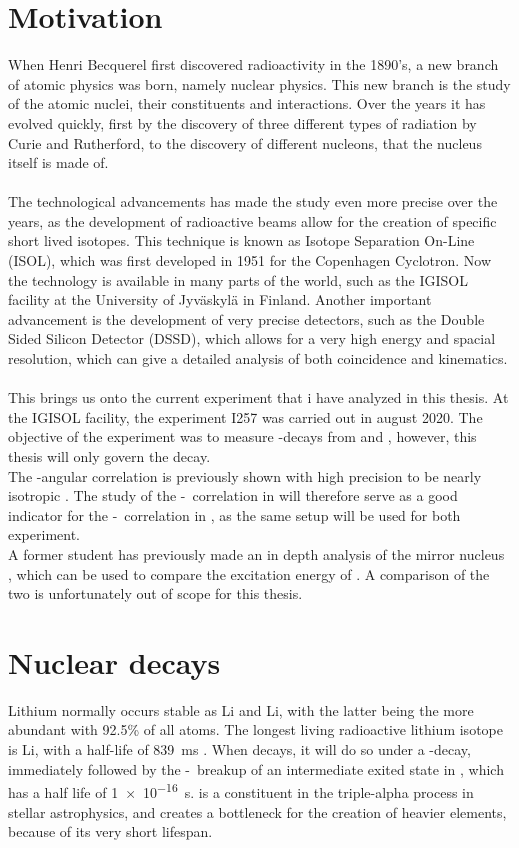 \section{Motivation}
When Henri Becquerel first discovered radioactivity in the 1890's, a new branch of atomic physics was born, namely nuclear physics. 
This new branch is the study of the atomic nuclei, their constituents and interactions. 
Over the years it has evolved quickly, first by the discovery of three different types of radiation by Curie and Rutherford, to the discovery of different nucleons, that the nucleus itself is made of. \\
\\
The technological advancements has made the study even more precise over the years, as the development of radioactive beams allow for the creation of specific short lived isotopes.
This technique is known as Isotope Separation On-Line (ISOL), which was first developed in 1951 for the Copenhagen Cyclotron. 
Now the technology is available in many parts of the world, such as the IGISOL facility at the University of Jyväskylä in Finland.
Another important advancement is the development of very precise detectors, such as the Double Sided Silicon Detector (DSSD), which allows for a very high energy and spacial resolution, which can give a detailed analysis of both coincidence and kinematics. \\
\\
This brings us onto the current experiment that i have analyzed in this thesis. At the IGISOL facility, the experiment I257 was carried out in august 2020. The objective of the experiment was to measure \be-decays from \li and , however, this thesis will only govern the \li decay. \\
The \be-\al angular correlation is previously shown with high precision to be nearly isotropic \cite{isotrop}. The study of the \be-\al\ correlation in \li will therefore serve as a good indicator for the \be-\al\ correlation in , as the same setup will be used for both experiment. \\
A former student has previously made an in depth analysis of the mirror nucleus , which can be used to compare the excitation energy of \ber. A comparison of the two is unfortunately out of scope for this thesis.


\section{Nuclear decays}
Lithium normally occurs stable as \isotope[6]Li and \isotope[7]Li, with the latter being the more abundant with 92.5\% of all atoms. The longest living radioactive lithium isotope is \isotope[8]Li, with a half-life of \SI{839}{ms} . 
When \li decays, it will do so under a \be-decay, immediately followed by the \al-\al\ breakup of an intermediate exited state in \ber, which has a half life of \SI{1e-16}{s}. \ber is a constituent in the triple-alpha process in stellar astrophysics, and creates a bottleneck for the creation of heavier elements, because of its very short lifespan.

